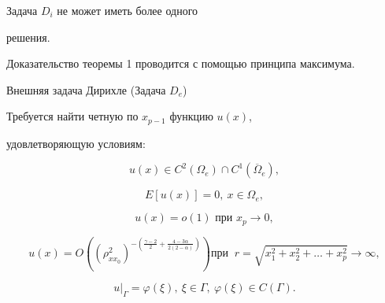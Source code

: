 \begin{theorem}[1]Задача $D_i $ не может иметь более одного


решения.


\end{theorem}


Доказательство теоремы 1 проводится с помощью принципа максимума.


\begin{newthm}{Внешняя задача Дирихле (Задача $D_e $)}


Требуется найти четную по $x_{p - 1} $ функцию $u(x)$, 


удовлетворяющую условиям{\rm:}


\begin{equation}


\label{chebotareva:eq31} u(x) \in C^2\left( {\Omega _e } \right)


\cap C^1\left( {\overline \Omega _e } \right), 


\end{equation}


\begin{equation}


\label{chebotareva:eq32} E\left[ {u(x)} \right] = 0,  ~ x \in


\Omega _e , 


\end{equation}


\begin{equation}


\label{chebotareva:eq33} u\left( x \right) = o\left( 1


\right)\text{ при }  x_p \to 0, 


\end{equation}


\begin{equation}


\label{chebotareva:eq34} u\left( x \right) = O\left( {\left( {\rho


_{xx_0 }^2 } \right)^{ - \left( {\frac{\gamma - 2}{2} + \frac{4 -


3\alpha }{2\left( {2 - \alpha } \right)}} \right)}} \right)\text{


при } ~ r = \sqrt {x_1^2 + x_2^2 + \dots + x_p^2 } \to \infty , 


\end{equation}


\begin{equation}


\label{chebotareva:eq35} u\big|_\Gamma = \varphi (\xi ),  ~ 


\xi \in \Gamma ,  ~ \varphi (\xi ) \in C\left( \Gamma


\right).


\end{equation}


\end{newthm}





